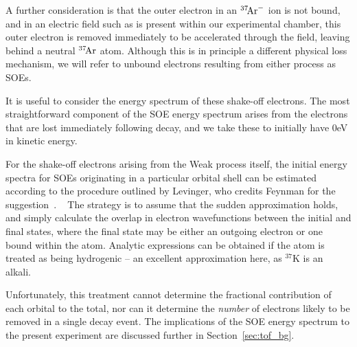 A further consideration is that the outer electron in an $^{37}\textrm{\!Ar}^{-}$ ion is not bound\cite{ArgonMinusIons}, and in an electric field such as is present within our experimental chamber, this outer electron is removed immediately to be accelerated through the field, leaving behind a neutral $^{37}\textrm{\!Ar}$ atom.  Although this is in principle a different physical loss mechanism, we will refer to unbound electrons resulting from either process as SOEs.  

It is useful to consider the energy spectrum of these shake-off electrons.  The most straightforward component of the SOE energy spectrum arises from the electrons that are lost immediately following decay, and we take these to initially have 0eV in kinetic energy.  

For the shake-off electrons arising from the Weak process itself, the initial energy spectra for SOEs originating in a particular orbital shell can be estimated according to the procedure outlined by Levinger, who credits Feynman for the suggestion~\cite{Levinger}.
~  \noindent
The strategy is to assume that the sudden approximation holds, and simply calculate the overlap in electron wavefunctions between the initial and final states, where the final state may be either an outgoing electron or one bound within the atom.  Analytic expressions can be obtained if the atom is treated as being hydrogenic -- an excellent approximation here, as $^{37}\textrm{K}$ is an alkali.  

Unfortunately, this treatment cannot determine the fractional contribution of each orbital to the total, nor can it determine the \emph{number} of electrons likely to be removed in a single decay event.  The implications of the SOE energy spectrum to the present experiment are discussed further in Section~\ref{sec:tof_bg}.


